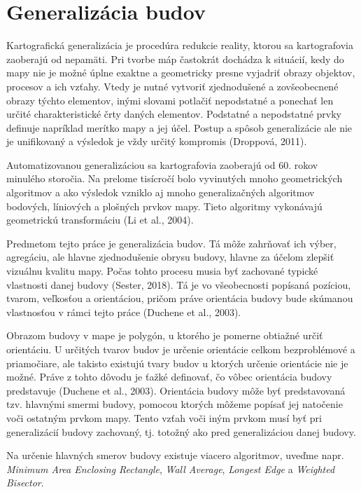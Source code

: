 \documentclass[11pt]{article}
\begin{document}
\section{Generalizácia budov} \label{gb}
Kartografická generalizácia je procedúra redukcie reality, ktorou sa kartografovia zaoberajú od nepamäti. Pri tvorbe máp častokrát dochádza k situácií, kedy do mapy nie je možné úplne exaktne a geometricky presne vyjadriť obrazy objektov, procesov a ich vzťahy. Vtedy je nutné vytvoriť zjednodušené a zovšeobecnené obrazy týchto elementov, inými slovami potlačiť nepodstatné a ponechať len určité charakteristické črty daných elementov. Podstatné a nepodstatné prvky definuje napríklad merítko mapy a jej účel. Postup a spôsob generalizácie ale nie je unifikovaný a výsledok je vždy určitý kompromis (Droppová, 2011).

Automatizovanou generalizáciou sa kartografovia zaoberajú od 60. rokov minulého storočia. Na prelome tisícročí bolo vyvinutých mnoho geometrických algoritmov a ako výsledok vzniklo aj mnoho generalizačných algoritmov bodových, líniových a plošných prvkov mapy. Tieto algoritmy vykonávajú geometrickú transformáciu (Li et al., 2004).

Predmetom tejto práce je generalizácia budov. Tá môže zahrňovať ich výber, agregáciu, ale hlavne zjednodušenie obrysu budovy, hlavne za účelom zlepšiť vizuálnu kvalitu mapy. Počas tohto procesu musia byť zachované typické vlastnosti danej budovy (Sester, 2018). Tá je vo všeobecnosti popísaná pozíciou, tvarom, veľkosťou a orientáciou, pričom práve orientácia budovy bude skúmanou vlastnosťou v rámci tejto práce (Duchene et al., 2003). 

Obrazom budovy v mape je polygón, u ktorého je pomerne obtiažné určiť orientáciu. U určitých tvarov budov je určenie orientácie celkom bezproblémové a priamočiare, ale takisto existujú tvary budov u ktorých určenie orientácie nie je možné. Práve z tohto dôvodu je ťažké definovať, čo vôbec orientácia budovy predstavuje (Duchene et al., 2003).\newline
Orientácia budovy môže byť predstavovaná tzv. hlavnými smermi budovy, pomocou ktorých môžeme popísať jej natočenie voči ostatným prvkom mapy. Tento vzťah voči iným prvkom musí byť pri generalizácií budovy zachovaný, tj. totožný ako pred generalizáciou danej budovy. 

Na určenie hlavných smerov budovy existuje viacero algoritmov, uveďme napr. \textit{Minimum Area Enclosing Rectangle}, \textit{Wall Average}, \textit{Longest Edge} a \textit{Weighted Bisector}.
\end{document}
